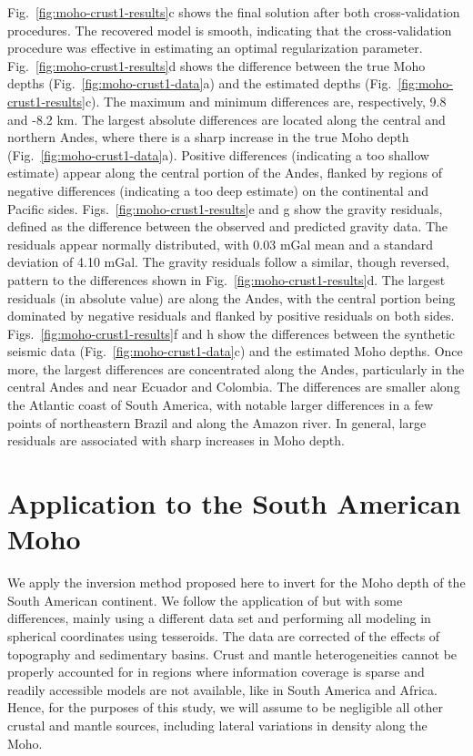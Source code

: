 Fig.~\ref{fig:moho-crust1-results}c shows the final solution after both
cross-validation procedures.
The recovered model is smooth, indicating that the cross-validation procedure
was effective in estimating an optimal regularization parameter.
Fig.~\ref{fig:moho-crust1-results}d shows the difference between
the true Moho depths (Fig.~\ref{fig:moho-crust1-data}a)
and the estimated depths (Fig.~\ref{fig:moho-crust1-results}c).
The maximum and minimum differences are, respectively,
9.8 and -8.2 km.
The largest absolute differences are located along the central and northern
Andes, where there is a sharp increase in the true Moho depth
(Fig.~\ref{fig:moho-crust1-data}a).
Positive differences (indicating a too shallow estimate)
appear along the central portion of the Andes,
flanked by regions of negative differences (indicating a too deep estimate)
on the continental and Pacific sides.
Figs.~\ref{fig:moho-crust1-results}e and g show the gravity residuals,
defined as the difference between the observed and predicted gravity data.
The residuals appear normally distributed,
with 0.03 mGal mean and a standard deviation of 4.10 mGal.
The gravity residuals follow a similar, though reversed, pattern
to the differences shown in Fig.~\ref{fig:moho-crust1-results}d.
The largest residuals (in absolute value) are along the Andes,
with the central portion being dominated by negative residuals
and flanked by positive residuals on both sides.
Figs.~\ref{fig:moho-crust1-results}f and h show the differences between
the synthetic seismic data (Fig.~\ref{fig:moho-crust1-data}c)
and the estimated Moho depths.
Once more, the largest differences are concentrated along the Andes,
particularly in the central Andes and near Ecuador and Colombia.
The differences are smaller along the Atlantic coast of South America,
with notable larger differences in a few points of northeastern Brazil
and along the Amazon river.
In general, large residuals are associated with sharp increases in Moho depth.



\section{Application to the South American Moho}


We apply the inversion method proposed here to invert for the Moho depth of the
South American continent.
We follow the application of \citet{vandermeijde2013} but with some
differences, mainly using a different data set and performing all modeling
in spherical coordinates using tesseroids.
The data are corrected of the effects of topography and sedimentary basins.
Crust and mantle heterogeneities cannot be properly accounted for
in regions where information coverage is sparse and readily accessible models
are not available, like in South America and Africa.
Hence, for the purposes of this study, we will assume to be negligible all
other crustal and mantle sources, including lateral variations in density along
the Moho.


